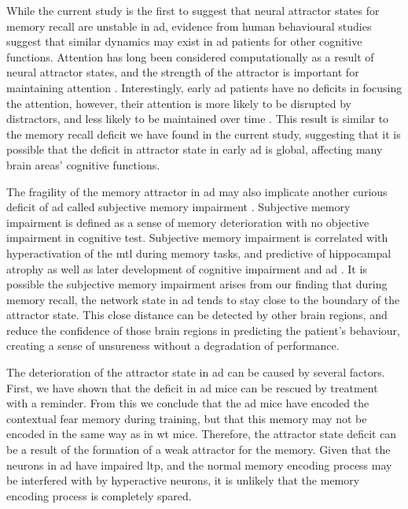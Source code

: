 While the current study is the first to suggest that neural attractor states for memory recall are unstable in \gls{ad}, evidence from human behavioural studies suggest that similar dynamics may exist in \gls{ad} patients for other cognitive functions. Attention has long been considered computationally as a result of neural attractor states, and the strength of the attractor is important for maintaining attention \citep{desimone95, rolls08a, rolls13a}. Interestingly, early \gls{ad} patients have no deficits in focusing the attention, however, their attention is more likely to be disrupted by distractors, and less likely to be maintained over time \citep{perry99}. This result is similar to the memory recall deficit we have found in the current study, suggesting that it is possible that the deficit in attractor state in early \gls{ad} is global, affecting many brain areas' cognitive functions. 

The fragility of the memory attractor in \gls{ad} may also implicate another curious deficit of \gls{ad} called subjective memory impairment \citep{jahn13}. Subjective memory impairment is defined as a sense of memory deterioration with no objective impairment in cognitive test. Subjective memory impairment is correlated with hyperactivation of the \gls{mtl} during memory tasks, and predictive of hippocampal atrophy as well as later development of cognitive impairment and \gls{ad} \citep{jahn13}. It is possible the subjective memory impairment arises from our finding that during memory recall, the network state in \gls{ad} tends to stay close to the boundary of the attractor state. This close distance can be detected by other brain regions, and reduce the confidence of those brain regions in predicting the patient's behaviour, creating a sense of unsureness without a degradation of performance.  

The deterioration of the attractor state in \gls{ad} can be caused by several factors. First, we have shown that the deficit in \gls{ad} mice can be rescued by \tglu{} treatment with a reminder. From this we conclude that the \gls{ad} mice have encoded the contextual fear memory during training, but that this memory may not be encoded in the same way as in \gls{wt} mice. Therefore, the attractor state deficit can be a result of the formation of a weak attractor for the memory. Given that the neurons in \gls{ad} have impaired \gls{ltp}, and the normal memory encoding process may be interfered with by hyperactive neurons, it is unlikely that the memory encoding process is completely spared. 

